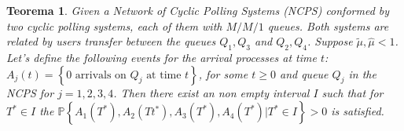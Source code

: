 \documentclass{article}
\newtheorem{Teo}{Teorema}
\newcommand{\prob}{\mathbb{P}}
\begin{document}
\begin{Teo}\label{First.Regeneration.Time.Theorem}
Given a Network of Cyclic Polling Systems (NCPS) conformed by two cyclic polling systems, each of them with $M/M/1$ queues. Both systems are related by users transfer between the queues $Q_{1},Q_{3}$ and $Q_{2},Q_{4}$. Suppose $\tilde{\mu},\hat{\mu}<1$. Let's define the following events for the arrival processes at time $t$: $A_{j}\left(t\right)=\left\{0 \textrm{ arrivals on }Q_{j}\textrm{ at time }t\right\}$, for some $t\geq0$ and queue $Q_{j}$ in the NCPS for $j=1,2,3,4$. Then there exist an non empty interval $I$ such that for $T^{*}\in I$ the $\prob\left\{A_{1}\left(T^{*}\right),A_{2}\left(Tt^{*}\right),
A_{3}\left(T^{*}\right),A_{4}\left(T^{*}\right)|T^{*}\in I\right\}>0$ is satisfied.

\end{Teo}
\end{document}
